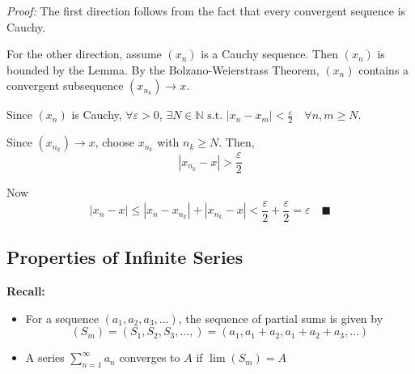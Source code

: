 \documentclass[12pt]{report}
\newcommand{\N}{\mathbb{N}}
\newcommand{\qed}{\quad \blacksquare}
\newcommand{\abs}[1]{\left\vert #1 \right\vert}
\newcommand{\st}{\text{ s.t. }}
\newcommand{\ep}{\varepsilon}
\newenvironment*{tbox}[2][gray]{
    \begin{tcolorbox}[
        parbox=false,
        colback=#1!5!white,
        colframe=#1!75!black,
        breakable,
        title={#2}
    ]}
    {\end{tcolorbox}}
\begin{document}
        \begin{tbox}{\textbf{Theorem (Cauchy Criternion):}  A sequence converges iff it is a Cauchy sequence}
            \emph{Proof:} The first direction follows from the fact that every convergent sequence is Cauchy. 

            For the other direction, assume $(x_n)$ is a Cauchy sequence. Then $(x_n)$ is bounded by the Lemma. By the Bolzano-Weierstrass Theorem, $(x_n)$ contains a convergent subsequence $(x_{n_k}) \to x$. 

            Since $(x_n)$ is Cauchy, $\forall \ep > 0$, $\exists N \in \N \st \abs{x_n - x_m} < \frac{\ep}{2} \quad \forall n, m \geq N$. 

            Since $(x_{n_k}) \to x$, choose $x_{n_k}$ with $n_k \geq N$. Then, 
            \[\abs{x_{n_k} - x} > \frac{\ep}{2}\]

            Now 
            \[\abs{x_n - x} \leq \abs{x_n - x_{n_k}} + \abs{x_{n_k} - x} < \frac{\ep}{2} + \frac{\ep}{2} = \ep \qed\]
        \end{tbox}

    \subsection*{Properties of Infinite Series}
        \textbf{Recall:}
        \begin{itemize}
            \item For a sequence $(a_1, a_2, a_3, \dots)$, the sequence of partial sums is given by 
            \[(S_m) = (S_1, S_2, S_3, \dots,) = (a_1, a_1 + a_2, a_1 + a_2 + a_3, \dots)\]

            \item A series $\sum_{n=1}^{\infty} a_n$ converges to $A$ if $\lim (S_m) = A$ 
        \end{itemize}
\end{document}
